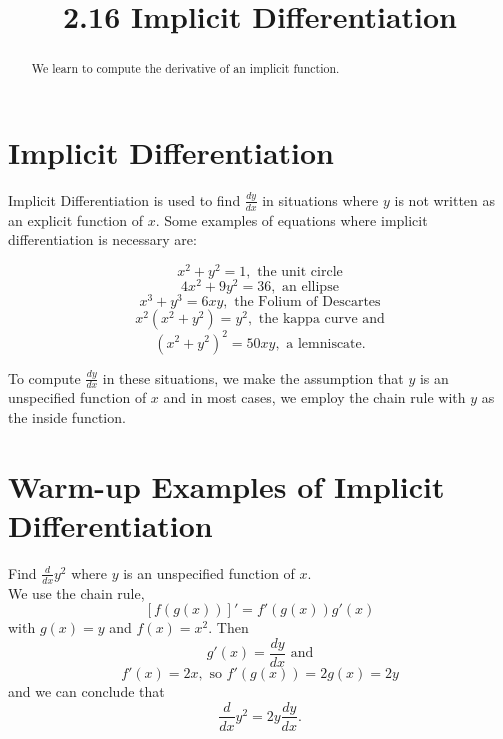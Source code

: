 \documentclass[handout]{ximera}
\title{2.16 Implicit Differentiation}
\begin{document}
\begin{abstract}
We learn to compute the derivative of an implicit function.
\end{abstract}

\maketitle

\section{Implicit Differentiation}

Implicit Differentiation is used to find $\frac{dy}{dx}$ in situations where $y$ is not written 
as an explicit function of $x$. 
Some examples of equations where implicit differentiation is necessary are:

\[x^2 + y^2 = 1, \text{ the unit circle} \]
\[4x^2 + 9y^2 = 36, \text{ an ellipse} \]
\[x^3 + y^3 =6xy, \text{ the Folium of Descartes}\]
\[x^2(x^2 + y^2) =y^2,  \text{ the kappa curve and}\]
\[(x^2 + y^2)^2 =50xy, \text{ a lemniscate}.\]

To compute $\frac{dy}{dx}$ in these situations, we make the assumption that $y$ is an unspecified 
function of $x$ and in most cases,
we employ the chain rule  with $y$ as the inside function.

\section{Warm-up Examples of Implicit Differentiation}

\begin{example}[example 1]
Find $\frac{d}{dx} y^2$ where $y$ is an unspecified function of $x$.\\
We use the chain rule,
\[\displaystyle{[f(g(x))]' = f'(g(x))g'(x)}\]
with $g(x) = y$ and $f(x) = x^2$. Then 
\[g'(x) = \frac{dy}{dx} \text{ and}\]
\[f'(x) = 2x, \text{ so } f'(g(x)) = 2g(x) = 2y\]
and we can conclude that
\[\frac{d}{dx} y^2 = 2y \frac{dy}{dx}.\]
\end{example}


\begin{center}
\begin{foldable}
\end{foldable}
\end{center}
\end{document}

